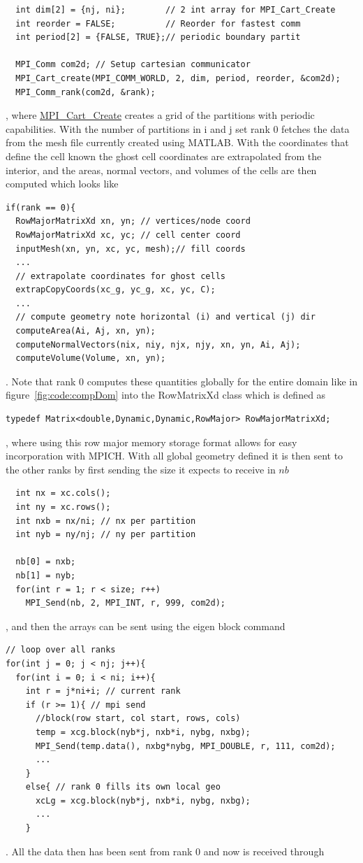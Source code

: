 \documentclass[paper=a4, fontsize=11pt]{scrartcl}
\numberwithin{equation}{section}                %
\numberwithin{figure}{section}                  %
\numberwithin{table}{section}                           %
\begin{document}
\begin{verbatim}
  int dim[2] = {nj, ni};        // 2 int array for MPI_Cart_Create
  int reorder = FALSE;          // Reorder for fastest comm
  int period[2] = {FALSE, TRUE};// periodic boundary partit

  MPI_Comm com2d; // Setup cartesian communicator
  MPI_Cart_create(MPI_COMM_WORLD, 2, dim, period, reorder, &com2d);
  MPI_Comm_rank(com2d, &rank);
\end{verbatim}

, where \href{https://www.mpich.org/static/docs/v3.2/www3/MPI\_Cart\_create.html}{MPI\_Cart\_Create} creates a grid of the partitions with periodic capabilities. With the number of partitions in i and j set rank 0 fetches the data from the mesh file currently created using MATLAB. With the coordinates that define the cell known the ghost cell coordinates are extrapolated from the interior, and the areas, normal vectors, and volumes of the cells are then computed which looks like

\begin{verbatim}
if(rank == 0){
  RowMajorMatrixXd xn, yn; // vertices/node coord
  RowMajorMatrixXd xc, yc; // cell center coord
  inputMesh(xn, yn, xc, yc, mesh);// fill coords
  ...
  // extrapolate coordinates for ghost cells
  extrapCopyCoords(xc_g, yc_g, xc, yc, C);
  ...
  // compute geometry note horizontal (i) and vertical (j) dir
  computeArea(Ai, Aj, xn, yn);
  computeNormalVectors(nix, niy, njx, njy, xn, yn, Ai, Aj);
  computeVolume(Volume, xn, yn);
\end{verbatim}
. Note that rank 0 computes these quantities globally for the entire domain like in figure~\ref{fig:code:compDom} into the RowMatrixXd class which is defined as
\begin{verbatim}
typedef Matrix<double,Dynamic,Dynamic,RowMajor> RowMajorMatrixXd;
\end{verbatim}
, where using this row major memory storage format allows for easy incorporation with MPICH. With all global geometry defined it is then sent to the other ranks by first sending the size it expects to receive in $nb$

\begin{verbatim}
  int nx = xc.cols();
  int ny = xc.rows(); 
  int nxb = nx/ni; // nx per partition
  int nyb = ny/nj; // ny per partition
  
  nb[0] = nxb;
  nb[1] = nyb;
  for(int r = 1; r < size; r++)
    MPI_Send(nb, 2, MPI_INT, r, 999, com2d);
\end{verbatim}
, and then the arrays can be sent using the eigen block command 
\begin{verbatim}
// loop over all ranks
for(int j = 0; j < nj; j++){
  for(int i = 0; i < ni; i++){
    int r = j*ni+i; // current rank
    if (r >= 1){ // mpi send
      //block(row start, col start, rows, cols)
      temp = xcg.block(nyb*j, nxb*i, nybg, nxbg); 
      MPI_Send(temp.data(), nxbg*nybg, MPI_DOUBLE, r, 111, com2d);
      ...
    }
    else{ // rank 0 fills its own local geo
      xcLg = xcg.block(nyb*j, nxb*i, nybg, nxbg);
      ...
    } 
\end{verbatim}
. All the data then has been sent from rank 0 and now is received through
\end{document}
